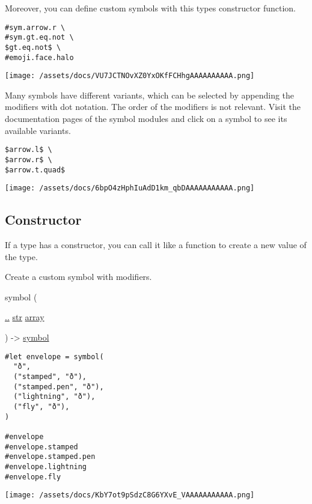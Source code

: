 Moreover, you can define custom symbols with this type\textquotesingle s
constructor function.

\begin{verbatim}
#sym.arrow.r \
#sym.gt.eq.not \
$gt.eq.not$ \
#emoji.face.halo
\end{verbatim}

\texttt{[image: /assets/docs/VU7JCTNOvXZ0YxOKfFCHhgAAAAAAAAAA.png]}

Many symbols have different variants, which can be selected by appending
the modifiers with dot notation. The order of the modifiers is not
relevant. Visit the documentation pages of the symbol modules and click
on a symbol to see its available variants.

\begin{verbatim}
$arrow.l$ \
$arrow.r$ \
$arrow.t.quad$
\end{verbatim}

\texttt{[image: /assets/docs/6bpO4zHphIuAdD1km\_qbDAAAAAAAAAAA.png]}

\subsection{\texorpdfstring{Constructor
{}}{Constructor }}\label{constructor}

\phantomsection\label{constructor-constructor-tooltip}
If a type has a constructor, you can call it like a function to create a
new value of the type.

Create a custom symbol with modifiers.

{ symbol } (

{ \hyperref[constructor-parameters-variants]{..}
\href{/docs/reference/foundations/str/}{str}
\href{/docs/reference/foundations/array/}{array} }

) -\textgreater{} \href{/docs/reference/symbols/symbol/}{symbol}

\begin{verbatim}
#let envelope = symbol(
  "ð",
  ("stamped", "ð"),
  ("stamped.pen", "ð"),
  ("lightning", "ð"),
  ("fly", "ð"),
)

#envelope
#envelope.stamped
#envelope.stamped.pen
#envelope.lightning
#envelope.fly
\end{verbatim}

\texttt{[image: /assets/docs/KbY7ot9pSdzC8G6YXvE\_VAAAAAAAAAAA.png]}

